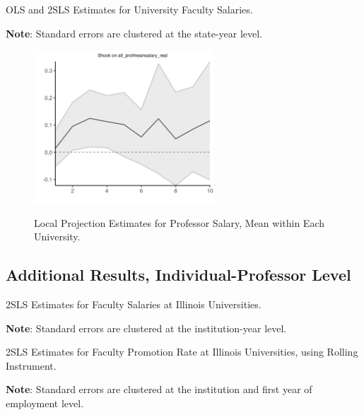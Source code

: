 \documentclass[notitlepage,12pt]{article}
\begin{document}
\begin{table}[H]
    \singlespacing
    \centering
    \caption{OLS and 2SLS Estimates for University Faculty Salaries.}
    \makebox[\textwidth][c]{}
    \begin{flushleft}
        \footnotesize
        \textbf{Note}: Standard errors are clustered at the state-year level.
    \end{flushleft}
    \label{tab:facultysalaries-shock-reg}
\end{table}

\begin{figure}[H]
    \centering
    \singlespacing
    \caption{Local Projection Estimates for Professor Salary, Mean within Each University.}
    \includegraphics[width=0.6\textwidth]{figures/all-salaries-lp.png}
    \label{fig:all-salaries-lp}
\end{figure}


\subsection{Additional Results, Individual-Professor Level}

\begin{table}[H]
    \singlespacing
    \centering
    \caption{2SLS Estimates for Faculty Salaries at Illinois Universities.}
    \makebox[\textwidth][c]{}
    \begin{flushleft}
        \footnotesize
        \textbf{Note}: Standard errors are clustered at the institution-year level.
    \end{flushleft}
    \label{tab:facultysalaries-shock-illinois}
\end{table}

\begin{table}[H]
    \singlespacing
    \centering
    \caption{2SLS Estimates for Faculty Promotion Rate at Illinois Universities, using Rolling Instrument.}
    \makebox[\textwidth][c]{}
    \begin{flushleft}
        \footnotesize
        \textbf{Note}: Standard errors are clustered at the institution and first year of employment level.
    \end{flushleft}
    \label{tab:promotion-shock-illinois-rolling}
\end{table}
\end{document}
